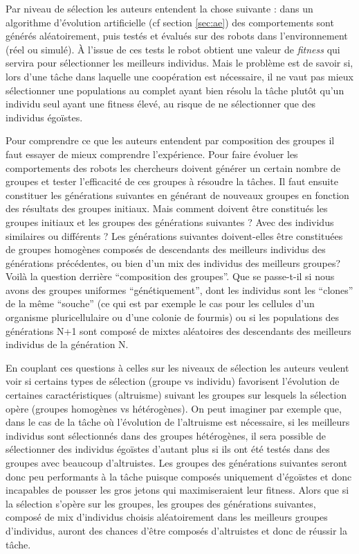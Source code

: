 Par niveau de sélection les auteurs entendent la chose suivante : dans un algorithme d'évolution artificielle (cf section \ref{sec:ae}) des comportements sont générés aléatoirement, puis testés et évalués sur des robots dans l'environnement (réel ou simulé). \`A l'issue de ces tests le robot obtient une valeur de \emph{fitness} qui servira pour sélectionner les meilleurs individus. Mais le problème est de savoir si, lors d'une tâche dans laquelle une coopération est nécessaire, il ne vaut pas mieux sélectionner une populations au complet ayant bien résolu la tâche plutôt qu'un individu seul ayant une fitness élevé, au risque de ne sélectionner que des individus égoïstes. 

Pour comprendre ce que les auteurs entendent par composition des groupes il faut essayer de mieux comprendre l'expérience. Pour faire évoluer les comportements des robots les chercheurs doivent générer un certain nombre de groupes et tester l'efficacité de ces groupes à résoudre la tâches. Il faut ensuite constituer les générations suivantes en générant de nouveaux groupes en fonction des résultats des groupes initiaux. Mais comment doivent être constitués les groupes initiaux et les groupes des générations suivantes ? Avec des individus similaires ou différents ? Les générations suivantes doivent-elles être constituées de groupes homogènes composés de descendants des meilleurs individus des générations précédentes, ou bien d'un mix des individus des meilleurs groupes? Voilà la question derrière ``composition des groupes''. Que se passe-t-il si nous avons des groupes uniformes ``génétiquement'', dont les individus sont les ``clones'' de la même ``souche'' (ce qui est par exemple le cas pour les cellules d'un organisme pluricellulaire ou d'une colonie de fourmis) ou si les populations des générations N+1 sont composé de mixtes aléatoires des descendants des meilleurs individus de la génération N.

En couplant ces questions à celles sur les niveaux de sélection les auteurs veulent voir si certains types de sélection (groupe vs individu) favorisent l'évolution de certaines caractéristiques (altruisme) suivant les groupes sur lesquels la sélection opère (groupes homogènes vs hétérogènes). On peut imaginer par exemple que, dans le cas de la tâche où l'évolution de l'altruisme est nécessaire, si les meilleurs individus sont sélectionnés dans des groupes hétérogènes, il sera possible de sélectionner des individus égoïstes d'autant plus si ils ont été testés dans des groupes avec beaucoup d'altruistes. Les groupes des générations suivantes seront donc peu performants à la tâche puisque composés uniquement d'égoïstes et donc incapables de pousser les gros jetons qui maximiseraient leur fitness. Alors que si la sélection s'opère sur les groupes, les groupes des générations suivantes, composé de mix d'individus choisis aléatoirement dans les meilleurs groupes d'individus, auront des chances d'être composés d'altruistes et donc de réussir la tâche.


